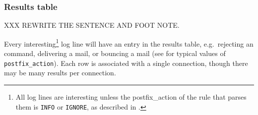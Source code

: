 \subsubsection{Results table}

\label{results table}

XXX REWRITE THE SENTENCE AND FOOT NOTE\@.

Every interesting\footnote{All log lines are interesting unless the
postfix\_action of the rule that parses them is \texttt{INFO} or
\texttt{IGNORE}, as described in .} log line
will have an entry in the results table, e.g.\ rejecting an \SMTP{}
command, delivering a mail, or bouncing a mail (see
 for typical values of
\texttt{postfix\_action}).  Each row is associated with a single
connection, though there may be many results per connection.

